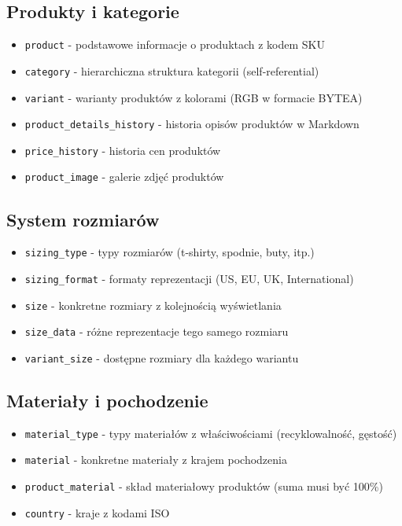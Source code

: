 \subsection*{Produkty i kategorie}
\begin{itemize}
    \item \texttt{product} - podstawowe informacje o produktach z kodem SKU
    \item \texttt{category} - hierarchiczna struktura kategorii (self-referential)
    \item \texttt{variant} - warianty produktów z kolorami (RGB w formacie BYTEA)
    \item \texttt{product\_details\_history} - historia opisów produktów w Markdown
    \item \texttt{price\_history} - historia cen produktów
    \item \texttt{product\_image} - galerie zdjęć produktów
\end{itemize}

\subsection*{System rozmiarów}
\begin{itemize}
    \item \texttt{sizing\_type} - typy rozmiarów (t-shirty, spodnie, buty, itp.)
    \item \texttt{sizing\_format} - formaty reprezentacji (US, EU, UK, International)
    \item \texttt{size} - konkretne rozmiary z kolejnością wyświetlania
    \item \texttt{size\_data} - różne reprezentacje tego samego rozmiaru
    \item \texttt{variant\_size} - dostępne rozmiary dla każdego wariantu
\end{itemize}

\subsection*{Materiały i pochodzenie}
\begin{itemize}
    \item \texttt{material\_type} - typy materiałów z właściwościami (recyklowalność, gęstość)
    \item \texttt{material} - konkretne materiały z krajem pochodzenia
    \item \texttt{product\_material} - skład materiałowy produktów (suma musi być 100\%)
    \item \texttt{country} - kraje z kodami ISO
\end{itemize}

